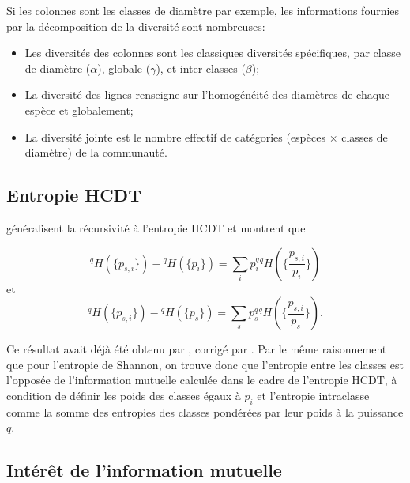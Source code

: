 \documentclass[
  11pt,
  french,
  a4paper,
  extrafontsizes,onecolumn,openright
  ]{memoir}
\providecommand{\tightlist}{%
  \setlength{\itemsep}{0pt}\setlength{\parskip}{0pt}}
\begin{document}
Si les colonnes sont les classes de diamètre par exemple, les informations fournies par la décomposition de la diversité sont nombreuses:

\begin{itemize}
\tightlist
\item
  Les diversités des colonnes sont les classiques diversités spécifiques, par classe de diamètre (\(\alpha\)), globale (\(\gamma\)), et inter-classes (\(\beta\));
\item
  La diversité des lignes renseigne sur l'homogénéité des diamètres de chaque espèce et globalement;
\item
  La diversité jointe est le nombre effectif de catégories (espèces \(\times\) classes de diamètre) de la communauté.
\end{itemize}

\hypertarget{sec:jointeHCDT}{%
\subsection{Entropie HCDT}\label{sec:jointeHCDT}}

\textcite{Baez2011} généralisent la récursivité à l'entropie HCDT et montrent que

\begin{equation}
  \label{eq:Baez2011a}
  ^{q}\!H\left(\{p_{s,i}\}\right) - {^{q}\!H}\left(\{p_i\}\right) 
  = \sum_i{{p_i^q} {^{q}\!H}\left(\{\frac{p_{s,i}}{p_i}\}\right)}
\end{equation}
et
\begin{equation}
  \label{eq:Baez2011b}
  ^{q}\!H\left(\{p_{s,i}\}\right) - {^{q}\!H}\left(\{p_s\}\right) 
  = \sum_s{{p_s^q} {^{q}\!H}\left(\{\frac{p_{s,i}}{p_s}\}\right)}.
\end{equation}

Ce résultat avait déjà été obtenu par \textcite{Suyari2004}, corrigé par \textcite{Ilic2013}.
Par le même raisonnement que pour l'entropie de Shannon, on trouve donc que l'entropie entre les classes est l'opposée de l'information mutuelle calculée dans le cadre de l'entropie HCDT, à condition de définir les poids des classes égaux à \(p_i\) et l'entropie intraclasse comme la somme des entropies des classes pondérées par leur poids à la puissance \(q\).

\hypertarget{intuxe9ruxeat-de-linformation-mutuelle}{%
\subsection{Intérêt de l'information mutuelle}\label{intuxe9ruxeat-de-linformation-mutuelle}}
\end{document}
